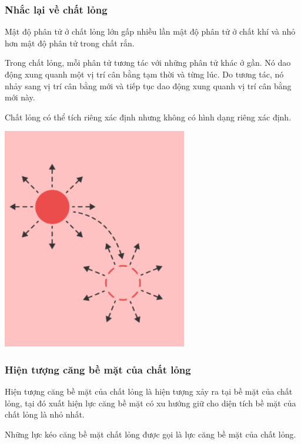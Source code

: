 \subsubsection{Nhắc lại về chất lỏng}
\begin{minipage}[l]{0.7\linewidth}
	Mật độ phân tử ở chất lỏng lớn gấp nhiều lần mật độ phân tử ở chất khí và nhỏ hơn mật độ phân tử trong chất rắn.
	
	Trong chất lỏng, mỗi phân tử tương tác với những phân tử khác ở gần. Nó dao động xung quanh một vị trí cân bằng tạm thời và từng lúc. Do tương tác, nó nhảy sang vị trí cân bằng mới và tiếp tục dao động xung quanh vị trí cân bằng mới này.
	
	Chất lỏng có thể tích riêng xác định nhưng không có hình dạng riêng xác định.
\end{minipage}
\begin{minipage}[r]{0.25\linewidth}
	\begin{flushright}
		\includegraphics[scale=0.5,angle=90]{../figs/VN10-PH-46-L-0341-1.png}
	\end{flushright}
\end{minipage}
\subsubsection{Hiện tượng căng bề mặt của chất lỏng}

Hiện tượng căng bề mặt của chất lỏng là hiện tượng xảy ra tại bề mặt của chất lỏng, tại đó xuất hiện lực căng bề mặt có xu hướng giữ cho diện tích bề mặt của chất lỏng là nhỏ nhất.

Những lực kéo căng bề mặt chất lỏng được gọi là lực căng bề mặt của chất lỏng.

